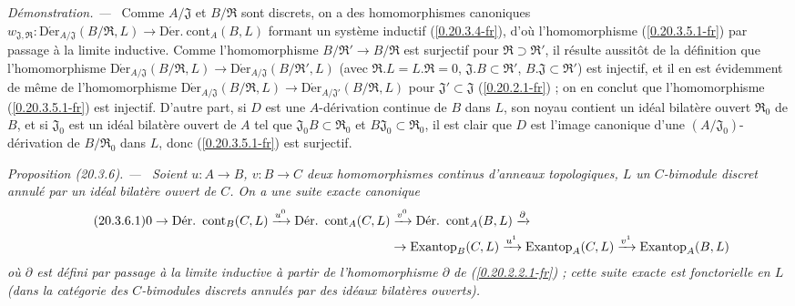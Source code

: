 \documentclass[10pt,oneside]{book}
\makeatletter
\newcommand{\sref}[1]{(\ref{#1})}
\newcommand{\setmanualcurrentlabel}[1]{\def\@currentlabel{#1}}
\newcommand{\oldpage}[2][]{%
  \setcounter{footnote}{0}%
  \marginpar{\scriptsize\textbf{#1}~|~#2}\ignorespaces}
\newenvironment{proposition}[1][]{%
  \setmanualcurrentlabel{#1}\par\medskip\noindent\itshape Proposition (#1). ---\ }{\par}
\newenvironment{proof}{%
  \par\medskip\noindent\textit{Démonstration. ---\ }}{\par}
\makeatother
\begin{document}
\begin{proof}
Comme $A/\mathfrak{J}$ et $B/\mathfrak{R}$ sont discrets, on a des
homomorphismes canoniques
$w_{\mathfrak{J},\mathfrak{R}}:
\operatorname{D\acute{e}r}_{A/\mathfrak{J}}(B/\mathfrak{R},L)\to
\operatorname{D\acute{e}r.\ cont}_A(B,L)$ formant un système inductif
\sref{0.20.3.4-fr}, d'où l'homomorphisme \sref{0.20.3.5.1-fr} par passage à
la limite inductive. Comme l'homomorphisme
$B/\mathfrak{R}'\to B/\mathfrak{R}$ est surjectif pour
$\mathfrak{R}\supset\mathfrak{R}'$, il résulte aussitôt de la définition que
l'homomorphisme
$\operatorname{D\acute{e}r}_{A/\mathfrak{J}}(B/\mathfrak{R},L)\to
\operatorname{D\acute{e}r}_{A/\mathfrak{J}}(B/\mathfrak{R}',L)$ (avec
$\mathfrak{R}.L=L.\mathfrak{R}=0$,
$\mathfrak{J}.B\subset\mathfrak{R}'$,
$B.\mathfrak{J}\subset\mathfrak{R}'$) est injectif, et il en est évidemment
de même de l'homomorphisme
$\operatorname{D\acute{e}r}_{A/\mathfrak{J}}(B/\mathfrak{R},L)\to
\operatorname{D\acute{e}r}_{A/\mathfrak{J}'}(B/\mathfrak{R},L)$ pour
$\mathfrak{J}'\subset\mathfrak{J}$ \sref{0.20.2.1-fr} ; on en conclut que
l'homomorphisme \sref{0.20.3.5.1-fr} est injectif. D'autre part, si $D$ est
une $A$-dérivation continue de $B$ dans $L$, son noyau contient un idéal
bilatère ouvert $\mathfrak{R}_0$ de $B$, et si $\mathfrak{J}_0$ est un idéal
bilatère ouvert de $A$ tel que $\mathfrak{J}_0B\subset\mathfrak{R}_0$ et
$B\mathfrak{J}_0\subset\mathfrak{R}_0$, il est clair que $D$ est l'image
canonique d'une $(A/\mathfrak{J}_0)$-dérivation de
$B/\mathfrak{R}_0$ dans $L$, donc \sref{0.20.3.5.1-fr} est surjectif.
\end{proof}

\oldpage[0\textsubscript{IV-1}]{123}
\begin{proposition}[20.3.6]
\label{0.20.3.6-fr}
Soient $u:A\to B$, $v:B\to C$ deux homomorphismes continus d'anneaux
topologiques, $L$ un $C$-bimodule discret annulé par un idéal bilatère ouvert
de $C$. On a une suite exacte canonique
\begin{align}
\tag{20.3.6.1}
\label{0.20.3.6.1-fr}
  0\to\operatorname{D\acute{e}r.\ cont}_B(C,L)\xrightarrow{u^0}
  \operatorname{D\acute{e}r.\ cont}_A(C,L)&\xrightarrow{v^0}
  \operatorname{D\acute{e}r.\ cont}_A(B,L)\xrightarrow{\partial} \\
  &\to\operatorname{Exantop}_B(C,L)\xrightarrow{u^1}
  \operatorname{Exantop}_A(C,L)\xrightarrow{v^1}
  \operatorname{Exantop}_A(B,L) \notag
\end{align}
où $\partial$ est défini par passage à la limite inductive à partir de
l'homomorphisme $\partial$ de \sref{0.20.2.2.1-fr} ; cette suite exacte est
fonctorielle en $L$ (dans la catégorie des $C$-bimodules discrets annulés par
des idéaux bilatères ouverts).
\end{proposition}
\end{document}
